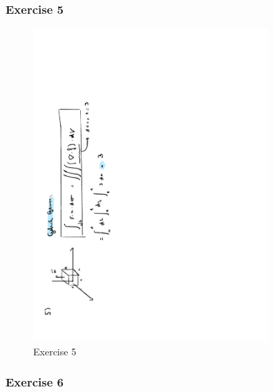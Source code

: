 \documentclass[a4paper]{report}
\begin{document}
\subsubsection{Exercise 5}

\begin{figure}[H]
	\centering
	\includegraphics[angle=-90, width=0.8\textwidth]{assets/huis_7_ex_5.pdf}
	\caption{Exercise 5}
\end{figure}

\subsubsection{Exercise 6}
\end{document}
